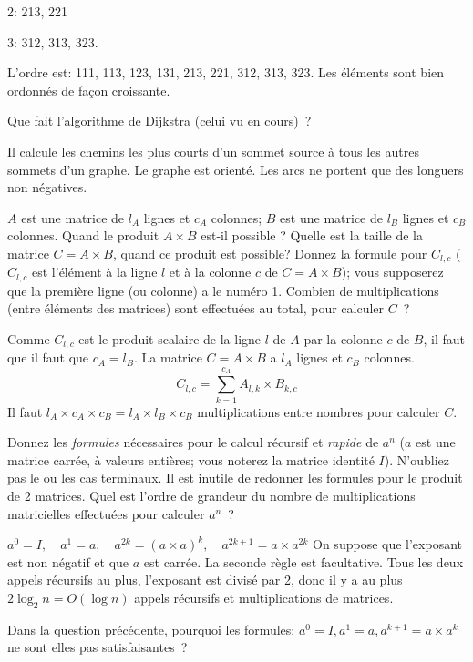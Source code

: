 \documentclass[11pt]{article}
\begin{document}
{ 2: 213, 221

 3: 312, 313, 323.

L'ordre est: 111, 113,  123, 131, 213, 221, 312, 313, 323. Les éléments sont bien ordonnés de façon croissante.


 Que fait l'algorithme de Dijkstra (celui vu en cours)~?
\medskip


Il calcule les chemins les plus courts d'un sommet source à tous les autres sommets d'un graphe. Le graphe est orienté. Les arcs ne portent que des longuers non négatives.



 {$A$ est une matrice de $l_A$ lignes et $c_A$ colonnes; $B$ est une matrice
de $l_B$ lignes et $c_B$ colonnes. Quand le produit $A\times  B$ est-il possible ?
Quelle est la taille de la matrice $C=A\times B$, quand ce produit est possible? 
Donnez la formule pour $C_{l,c}$ ($C_{l,c}$ est l'élément à la ligne 
$l$ et à la colonne $c$ de 
$C=A\times B$); vous supposerez que la première ligne (ou colonne) a le numéro 1.
Combien de multiplications (entre éléments des matrices) sont effectuées au total, 
pour calculer $C$~?


\medskip

Comme $C_{l, c}$ est le produit scalaire de la ligne $l$ de $A$ par la colonne $c$ de $B$, il faut que 
il faut que $c_A=l_B$. La matrice $C=A\times B$ a $l_A$ lignes et $c_B$ colonnes.
$$C_{l,c}=\sum_{k=1}^{c_A} A_{l,k} \times B_{k, c}$$
Il faut $l_A\times c_A \times c_B= l_A\times l_B \times c_B$ multiplications entre nombres pour calculer $C$.

 {Donnez les {\it formules} n\'ecessaires pour le calcul r\'ecursif 
et {\it rapide} de $a^n$ ($a$ est une matrice carrée, à valeurs enti\`eres;  
vous noterez la matrice identité $I$). N'oubliez pas le ou les cas terminaux. 
Il est inutile de redonner les formules pour le produit de 2 matrices. 
Quel est l'ordre de grandeur du 
nombre de multiplications  matricielles effectuées pour calculer $a^n$~?}  


\medskip

$a^0=I,\quad a^1= a,\quad a^{2k}=(a\times a)^k,\quad a^{2k+1}= a\times a^{2k}$
On suppose que l'exposant est non négatif et que $a$ est carrée.
La seconde règle est facultative. 
Tous les deux appels récursifs au plus, l'exposant est divisé par 2, donc
il y a au plus $2 \log_2 n = O(\log n)$ appels récursifs et multiplications de matrices.  

 {Dans la question précédente, pourquoi les formules: $a^0=I, a^1=a, a^{k+1}=a \times a^k$ ne sont elles pas satisfaisantes~?}

}}
\end{document}
